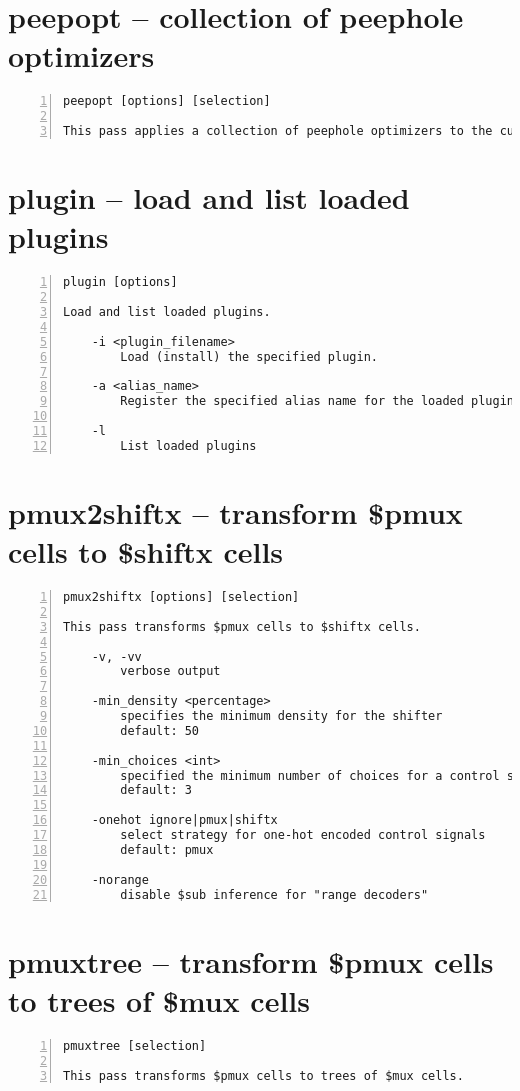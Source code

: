 \section{peepopt -- collection of peephole optimizers}
\label{cmd:peepopt}
\begin{lstlisting}[numbers=left,frame=single]
    peepopt [options] [selection]

This pass applies a collection of peephole optimizers to the current design.
\end{lstlisting}

\section{plugin -- load and list loaded plugins}
\label{cmd:plugin}
\begin{lstlisting}[numbers=left,frame=single]
    plugin [options]

Load and list loaded plugins.

    -i <plugin_filename>
        Load (install) the specified plugin.

    -a <alias_name>
        Register the specified alias name for the loaded plugin

    -l
        List loaded plugins
\end{lstlisting}

\section{pmux2shiftx -- transform \$pmux cells to \$shiftx cells}
\label{cmd:pmux2shiftx}
\begin{lstlisting}[numbers=left,frame=single]
    pmux2shiftx [options] [selection]

This pass transforms $pmux cells to $shiftx cells.

    -v, -vv
        verbose output

    -min_density <percentage>
        specifies the minimum density for the shifter
        default: 50

    -min_choices <int>
        specified the minimum number of choices for a control signal
        default: 3

    -onehot ignore|pmux|shiftx
        select strategy for one-hot encoded control signals
        default: pmux

    -norange
        disable $sub inference for "range decoders"
\end{lstlisting}

\section{pmuxtree -- transform \$pmux cells to trees of \$mux cells}
\label{cmd:pmuxtree}
\begin{lstlisting}[numbers=left,frame=single]
    pmuxtree [selection]

This pass transforms $pmux cells to trees of $mux cells.
\end{lstlisting}

